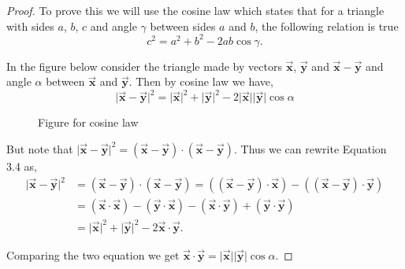 \documentclass[12pt]{article}
\theoremstyle{remark}
\let\oldvec = \vec
\renewcommand{\vec}[1]{\oldvec{\mathbf{#1}}}
\numberwithin{equation}{section}
\begin{document}
\begin{proof}
    To prove this we will use the cosine law which states that for a triangle with sides $ a $, $ b $, $ c $ and angle $ \gamma $ between sides $ a $ and $ b $, the following relation is true
    \[ c^2 = a^2 + b^2 - 2ab\cos{\gamma}. \] 

    In the figure below consider the triangle made by vectors $ \vec{x} $, $ \vec{y} $ and $ \vec{x} - \vec{y} $ and angle $ \alpha $ between $ \vec{x} $ and $ \vec{y} $. Then by cosine law we have,
    \begin{equation}
	    \lvert \vec{x}-\vec{y} \rvert^{2} = \lvert \vec{x} \rvert^{2} + \lvert \vec{y} \rvert^{2} - 2 \lvert \vec{x} \rvert \lvert \vec{y} \rvert \cos{\alpha}
    \end{equation}
    

\begin{figure}[htp]
	\centering
	\caption{Figure for cosine law}
\end{figure}

But note that $ \lvert \vec{x} - \vec{y} \rvert^{2} = (\vec{x} - \vec{y}) \cdot (\vec{x} - \vec{y}) $. Thus we can rewrite Equation 3.4 as, 
\begin{align}
	\lvert \vec{x} - \vec{y} \rvert^{2} &= (\vec{x} - \vec{y}) \cdot (\vec{x} - \vec{y}) %
	 = ((\vec{x} - \vec{y}) \cdot \vec{x}) - ((\vec{x} - \vec{y}) \cdot \vec{y}) \\ 
					    &= (\vec{x} \cdot \vec{x}) - (\vec{y} \cdot \vec{x}) %
					     - (\vec{x} \cdot \vec{y}) + (\vec{y} \cdot \vec{y}) \\
					    &= \lvert \vec{x} \rvert^2 + \lvert \vec{y} \rvert^2 - 2 \vec{x} \cdot \vec{y}. 
\end{align}

Comparing the two equation we get $ \vec{x} \cdot \vec{y} = \lvert \vec{x} \rvert \lvert \vec{y} \rvert \cos{\alpha} $.

\end{proof}
\end{document}
